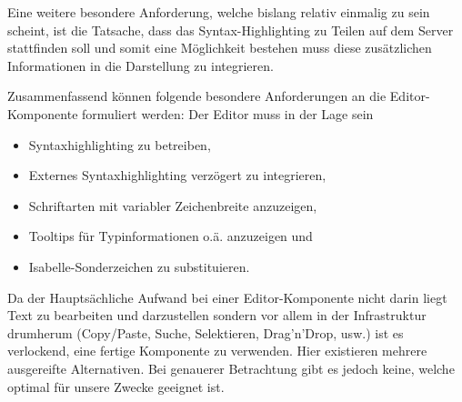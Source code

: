 Eine weitere besondere Anforderung, welche bislang relativ einmalig zu sein scheint, ist die
Tatsache, dass das Syntax-Highlighting zu Teilen auf dem Server stattfinden soll und somit eine
Möglichkeit bestehen muss diese zusätzlichen Informationen in die Darstellung zu integrieren.

Zusammenfassend können folgende besondere Anforderungen an die Editor-Komponente formuliert werden:
Der Editor muss in der Lage sein

\begin{itemize}
  \item Syntaxhighlighting zu betreiben,
  \item Externes Syntaxhighlighting verzögert zu integrieren,
  \item Schriftarten mit variabler Zeichenbreite anzuzeigen,
  \item Tooltips für Typinformationen o.ä. anzuzeigen und
  \item Isabelle-Sonderzeichen zu substituieren.
\end{itemize}

Da der Hauptsächliche Aufwand bei einer Editor-Komponente nicht darin liegt Text zu bearbeiten und
darzustellen sondern vor allem in der Infrastruktur drumherum (Copy/Paste, Suche, Selektieren,
Drag'n'Drop, usw.) ist es verlockend, eine fertige Komponente zu verwenden. Hier existieren mehrere
ausgereifte Alternativen. Bei genauerer Betrachtung gibt es jedoch keine, welche optimal für unsere
Zwecke geeignet ist. 


